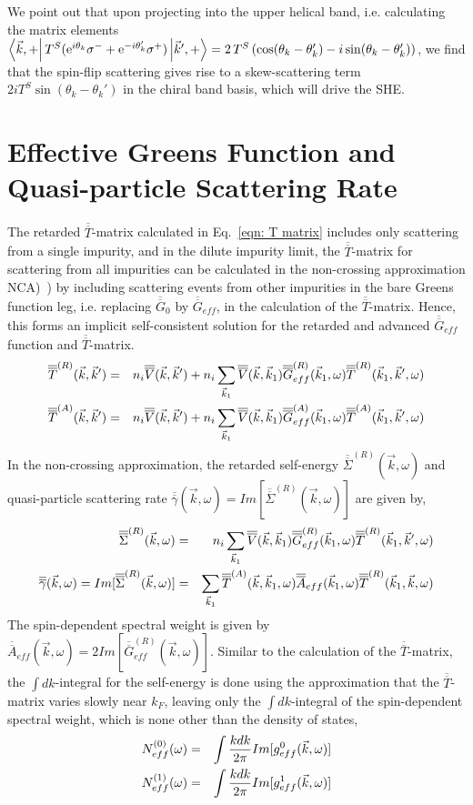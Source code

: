 \documentclass[letter,12pt,preprint,aps]{revtex4-1}
\newcommand{\ba}{\begin{eqnarray}}
\newcommand{\ea}{\end{eqnarray}}
\newcommand{\me}{\mathrm{e}}
\newcommand{\Vbar}{\overline{\overline{V}}}
\newcommand{\Gbar}{\overline{\overline{G}}}
\newcommand{\Tbar}{\overline{\overline{T}}}
\newcommand{\gbar}{\overline{\overline{\gamma}}}
\begin{document}
We point out that upon projecting into the upper helical band, i.e. calculating the matrix elements $\bra{\vec{k}, +} T^S (\me^{i \theta_{k}} \sigma^- + \me^{-i \theta_{k}'} \sigma^+) \ket{\vec{k}', +} = 2 \, T^S \left(  \cos(\theta_{k} - \theta_{k}') -i \sin(\theta_{k} - \theta_{k}') \right)$, we find that the spin-flip scattering gives rise to a skew-scattering term $2 i T^S \sin(\theta_{k} - \theta_{k}')$ in the chiral band basis, which will drive the SHE. 

\section{Effective Greens Function and Quasi-particle Scattering Rate}

The retarded $\Tbar$-matrix calculated in Eq.~\ref{eqn: T matrix} includes only scattering from a single impurity, and in the dilute impurity limit, the $\Tbar$-matrix for scattering from all impurities can be calculated in the non-crossing approximation NCA)~\cite{Rammer2004}) by including scattering events from other impurities in the bare Greens function leg, i.e. replacing $\Gbar_0$ by $\Gbar_{eff}$, in the calculation of the $\Tbar$-matrix. Hence, this forms an implicit self-consistent solution for the retarded and advanced $\Gbar_{eff}$ function and $\Tbar$-matrix.
%
\ba
\label{eqn: dilute limit T matrix}
\Tbar^{(R)}(\vec{k}, \vec{k}') & = & n_i \Vbar(\vec{k}, \vec{k}') + n_i \sum_{\vec{k}_1} \Vbar(\vec{k}, \vec{k}_1) \Gbar^{(R)}_{eff}(\vec{k}_1, \omega) \Tbar^{(R)}(\vec{k}_1, \vec{k}',\omega) \cr
\Tbar^{(A)}(\vec{k}, \vec{k}') & = & n_i \Vbar(\vec{k}, \vec{k}') + n_i \sum_{\vec{k}_1} \Vbar(\vec{k}, \vec{k}_1) \Gbar^{(A)}_{eff}(\vec{k}_1, \omega) \Tbar^{(A)}(\vec{k}_1, \vec{k}',\omega)
\ea
%
In the non-crossing approximation, the retarded self-energy $\overline{\overline{\Sigma}}^{(R)}(\vec{k}, \omega)$ and quasi-particle scattering rate $\gbar(\vec{k}, \omega) = Im[\overline{\overline{\Sigma}}^{(R)}(\vec{k}, \omega)]$ are given by,
%
\ba
\label{eqn: Self energy}
\overline{\overline{\Sigma}}^{(R)}(\vec{k}, \omega) & = & n_i \sum_{\vec{k}_1} \Vbar(\vec{k}, \vec{k}_1) \Gbar^{(R)}_{eff}(\vec{k}_1, \omega) \Tbar^{(R)}(\vec{k}_1, \vec{k}',\omega) \cr
\gbar(\vec{k}, \omega) = Im[\overline{\overline{\Sigma}}^{(R)}(\vec{k}, \omega)] & = & \sum_{\vec{k}_1} \Tbar^{(A)}(\vec{k}, \vec{k}_1, \omega) \overline{\overline{A}}_{eff}(\vec{k}_1, \omega) \Tbar^{(R)}(\vec{k}_1, \vec{k}, \omega)
\ea
%
The spin-dependent spectral weight is given by $\overline{\overline{A}}_{eff}(\vec{k}, \omega) = 2 Im[\Gbar_{eff}^{(R)}(\vec{k}, \omega)]$. Similar to the calculation of the $\Tbar$-matrix, the $\int dk$-integral for the self-energy is done using the approximation that the $\Tbar$-matrix varies slowly near $k_F$, leaving only the $\int dk$-integral of the spin-dependent spectral weight, which is none other than the density of states,
%
\ba
\label{eqn: DOS}
N_{eff}^{(0)}(\omega) & = & \int \frac{k dk}{2 \pi} Im[g_{eff}^{0}(\vec{k}, \omega)]  \cr
N_{eff}^{(1)}(\omega) & = & \int \frac{k dk}{2 \pi} Im[g_{eff}^{1}(\vec{k}, \omega)]
\ea
\end{document}
